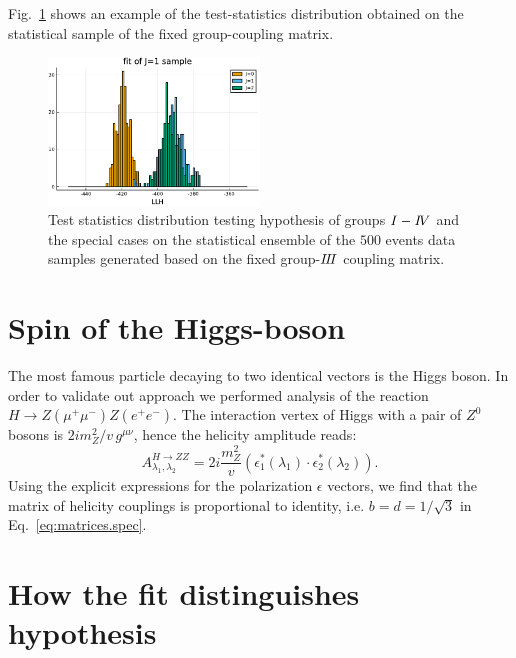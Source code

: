 \documentclass[prd,preprintnumbers,floatfix,
nofootinbib,superscriptaddress]{revtex4}
\begin{document}
Fig.~\ref{fig:TS.fixedH} shows an example of the test-statistics distribution obtained on the statistical sample of the fixed group-\III coupling matrix.

\begin{figure}
  \includegraphics[width=0.5\textwidth]{../plots/fit_of_J1.pdf}
  \caption{Test statistics distribution testing hypothesis of groups $I-{I\!V}$ and the special cases on the statistical ensemble of the $500$ events data samples generated based on
  the fixed group-${I\!I\!I}$ coupling matrix. }
  \label{fig:TS.fixedH}
\end{figure}

\section{Spin of the Higgs-boson}
The most famous particle decaying to two identical vectors is the Higgs boson.
In order to validate out approach we performed analysis of the reaction $H\to Z(\mu^+\mu^-)Z(e^+e^-)$.
The interaction vertex of Higgs with a pair of $Z^0$ bosons is $2i m_Z^2/v\,g^{\mu\nu}$,
hence the helicity amplitude reads:
\begin{equation} \label{eq:HZZ}
  A^{H\to ZZ}_{\lambda_1,\lambda_2} = 2i\frac{m_Z^2}{v} (\epsilon_1^*(\lambda_1)\cdot\epsilon_2^*(\lambda_2)).
\end{equation}
Using the explicit expressions for the polarization $\epsilon$ vectors,
we find that the matrix of helicity couplings is proportional to identity, i.e. $b=d=1/\sqrt{3}$ in Eq.~\eqref{eq:matrices.spec}.


\section{How the fit distinguishes hypothesis}
\end{document}
